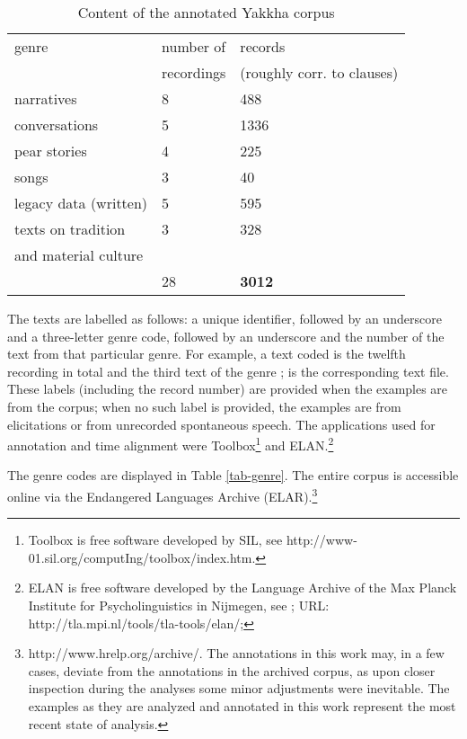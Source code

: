 \begin{table}[htp]
\begin{center}
\begin{tabular}{lll}
\toprule
{\sc genre}&{\sc number of }&{\sc records}\\
& {\sc recordings}& (roughly corr. to clauses)\\
\midrule
narratives	&8&	488\\
conversations	&5&	1336\\
pear stories	&4	&225\\
songs	&3	&40\\
legacy data (written)	&5&	595\\
texts on tradition 	&3	&328\\
and material culture	&	&\\
\midrule
&28&\bf 3012\\
\bottomrule
\end{tabular}
\caption{Content of the annotated Yakkha corpus}\label{tab-corpus}
\end{center}
\end{table}


The texts are labelled as follows: a unique identifier, followed by an underscore and a three-letter genre code, followed by an underscore and the number of the text from that particular genre. For example, a text coded  is the twelfth recording in total and the third text of the genre ;  is the corresponding text file. These labels (including the record number) are provided when the examples are from the corpus; when no such label is provided, the examples are from elicitations or from unrecorded spontaneous speech. The applications used for annotation and time alignment were Toolbox\footnote{Toolbox is free software developed by SIL, see http://www-01.sil.org/computIng/toolbox/index.htm.} and ELAN.\footnote{ELAN is free software developed by the Language Archive of the Max Planck Institute for Psycholinguistics in Nijmegen, see  \citet{Wittenburg2008_Annotation}; URL: http://tla.mpi.nl/tools/tla-tools/elan/;}

The genre codes are displayed in Table \ref{tab-genre}.  The entire corpus is accessible online via the Endangered Languages Archive (ELAR).\footnote{http://www.hrelp.org/archive/. The annotations in this work may, in a few cases, deviate from the annotations in the archived corpus, as upon closer inspection during the analyses some minor adjustments were inevitable. The examples as they are analyzed and annotated in this work represent the most recent state of analysis.}

